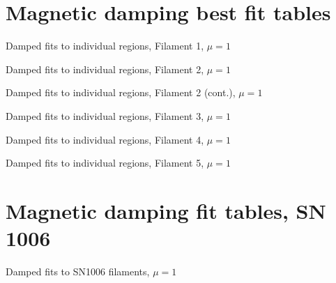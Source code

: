\documentclass[iop, apj, numberedappendix]{emulateapj}
\begin{document}
\clearpage
\section{Magnetic damping best fit tables}

\begin{table*}[ht]
    \scriptsize
    \centering
    \caption{Damped fits to individual regions, Filament 1, $\mu = 1$}
    
\end{table*}

\begin{table*}[ht]
    \scriptsize
    \centering
    \caption{Damped fits to individual regions, Filament 2, $\mu = 1$}
    
\end{table*}

\begin{table*}[ht]
    \scriptsize
    \centering
    \caption{Damped fits to individual regions, Filament 2 (cont.), $\mu = 1$}
    
\end{table*}

\begin{table*}[ht]
    \scriptsize
    \centering
    \caption{Damped fits to individual regions, Filament 3, $\mu = 1$}
    
\end{table*}

\begin{table*}[ht]
    \scriptsize
    \centering
    \caption{Damped fits to individual regions, Filament 4, $\mu = 1$}
    
\end{table*}

\begin{table*}[ht]
    \scriptsize
    \centering
    \caption{Damped fits to individual regions, Filament 5, $\mu = 1$}
    
\end{table*}

\clearpage
\section{Magnetic damping fit tables, SN 1006}

\begin{table*}[ht]
    \scriptsize
    \centering
    \caption{Damped fits to SN1006 filaments, $\mu = 1$}
    
\end{table*}
\end{document}
